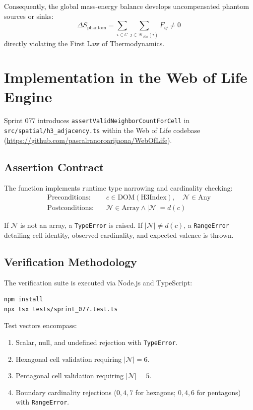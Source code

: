 \documentclass[10pt,journal,compsoc]{IEEEtran}
\begin{document}
Consequently, the global mass-energy balance develops uncompensated phantom sources or sinks:
\begin{equation}
\Delta S_{\text{phantom}} = \sum_{i \in \mathcal{C}} \sum_{j \in \mathcal{N}_{\text{obs}}(i)} F_{ij} \neq 0
\end{equation}
directly violating the First Law of Thermodynamics.

\section{Implementation in the Web of Life Engine}
Sprint 077 introduces \texttt{assertValidNeighborCountForCell} in \texttt{src/spatial/h3\_adjacency.ts} within the Web of Life codebase (\url{https://github.com/pascalranoroarijaona/WebOfLife}).

\subsection{Assertion Contract}
The function implements runtime type narrowing and cardinality checking:
\begin{align*}
\text{Preconditions:} & \quad c \in \text{DOM}(\text{H3Index}), \quad \mathcal{N} \in \text{Any} \\
\text{Postconditions:} & \quad \mathcal{N} \in \text{Array} \land |\mathcal{N}| = d(c)
\end{align*}

If $\mathcal{N}$ is not an array, a \texttt{TypeError} is raised. If $|\mathcal{N}| \neq d(c)$, a \texttt{RangeError} detailing cell identity, observed cardinality, and expected valence is thrown.

\subsection{Verification Methodology}
The verification suite is executed via Node.js and TypeScript:
\begin{lstlisting}
npm install
npx tsx tests/sprint_077.test.ts
\end{lstlisting}

Test vectors encompass:
\begin{enumerate}
    \item Scalar, null, and undefined rejection with \texttt{TypeError}.
    \item Hexagonal cell validation requiring $|\mathcal{N}| = 6$.
    \item Pentagonal cell validation requiring $|\mathcal{N}| = 5$.
    \item Boundary cardinality rejections ($0, 4, 7$ for hexagons; $0, 4, 6$ for pentagons) with \texttt{RangeError}.
\end{enumerate}
\end{document}
